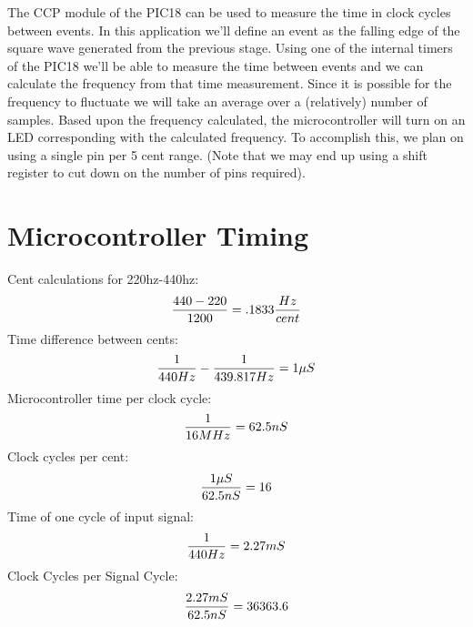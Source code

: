 \documentclass[12pt]{article}
\begin{document}
The CCP module of the PIC18 can be used to measure the time in clock cycles between events. In this
application we'll define an event as the falling edge of the square wave generated from the previous
stage. Using one of the internal timers of the PIC18 we'll be able to measure the time between events
and we can calculate the frequency from that time measurement. Since it is possible for the frequency
to fluctuate we will take an average over a (relatively) number of samples. Based upon the frequency
calculated, the microcontroller will turn on an LED corresponding with the calculated frequency. To
accomplish this, we plan on using a single pin per 5 cent range. (Note that we may end up using a shift
register to cut down on the number of pins required).

\section{Microcontroller Timing}
Cent calculations for 220hz-440hz:
\begin{equation}
{{440 - 220} \over 1200} = .1833 {Hz \over cent}
\end{equation}
Time difference between cents:
\begin{equation}
{1 \over 440 Hz} - {1 \over 439.817 Hz} = 1\mu S
\end{equation}
Microcontroller time per clock cycle:
\begin{equation}
{1 \over 16 MHz} = 62.5nS
\end{equation}
Clock cycles per cent:
\begin{equation}
{1\mu S \over 62.5 nS} = 16
\end{equation}
Time of one cycle of input signal:
\begin{equation}
{1 \over 440 Hz} = 2.27 mS
\end{equation}
Clock Cycles per Signal Cycle:
\begin{equation}
{2.27 mS \over 62.5 nS} = 36363.6
\end{equation}
\end{document}
